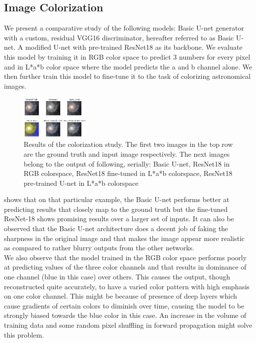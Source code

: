 \documentclass[10pt,twocolumn,letterpaper]{article}
\begin{document}
    \subsection{Image Colorization}
    \hspace*{0.167 in}We present a comparative study of the following models: Basic U-net generator with a custom, residual VGG16 discriminator, hereafter referred to as Basic U-net. A modified U-net with pre-trained ResNet18 as its backbone. We evaluate this model by training it in RGB color space to predict 3 numbers for every pixel and in L*a*b color space where the model predicts the a and b channel alone. We then further train this model to fine-tune it to the task of colorizing astronomical images.
    \begin{figure}[!htb]
    \centering
    	\includegraphics[width=0.3\textwidth]{figures/comparison_color}
    	\caption{Results of the colorization study. The first two images in the top row are the ground truth and input image respectively. The next images belong to the output of following, serially: Basic U-net, ResNet18 in RGB colorspace, ResNet18 fine-tuned in L*a*b colorspace, ResNet18 pre-trained U-net in L*a*b colorspace}
    	\label{color_results}
    \end{figure}
     shows that on that particular example, the Basic U-net performs better at predicting results that closely map to the ground truth but the fine-tuned ResNet-18 shows promising results over a larger set of inputs. It can also be observed that the Basic U-net architecture does a decent job of faking the sharpness in the original image and that makes the image appear more realistic as compared to rather blurry outputs from the other networks. \\
    \hspace*{0.167 in}We also observe that the model trained in the RGB color space performs poorly at predicting values of the three color channels and that results in dominance of one channel (blue in this case) over others. This causes the output, though reconstructed quite accurately, to have a varied color pattern with high emphasis on one color channel. This might be because of presence of deep layers which cause gradients of certain colors to diminish over time, causing the model to be strongly biased towards the blue color in this case. An increase in the volume of training data and some random pixel shuffling in forward propagation might solve this problem. \\
\end{document}
